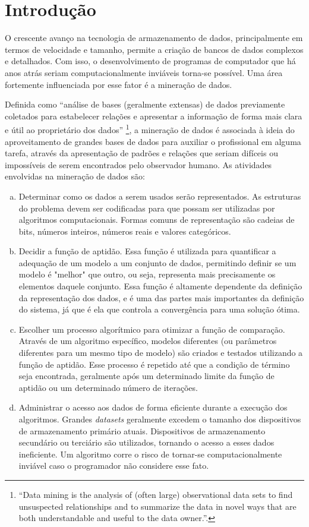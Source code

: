 \chapter{Introdução}

O crescente avanço na tecnologia de armazenamento de dados, principalmente em termos de velocidade e tamanho, permite a criação de bancos de dados complexos e detalhados. Com isso, o desenvolvimento de programas de computador que há anos atrás seriam computacionalmente inviáveis torna-se possível. Uma área fortemente influenciada por esse fator é a mineração de dados.

Definida como ``análise de bases (geralmente extensas) de dados previamente coletados para estabelecer relações e apresentar a informação de forma mais clara e útil ao proprietário dos dados'' \cite[p. 1]{Hand2001}\footnote{``Data mining is the analysis of (often large) observational data sets to find unsuspected relationships and to summarize the data in novel ways that are both understandable and useful to the data owner.''.}, a mineração de dados é associada à ideia do aproveitamento de grandes bases de dados para auxiliar o profissional em alguma tarefa, através da apresentação de padrões e relações que seriam difíceis ou impossíveis de serem encontrados pelo observador humano. As atividades envolvidas na mineração de dados são:

\begin{enumerate}[a)]
    \item Determinar como os dados a serem usados serão representados. As estruturas do problema devem ser codificadas para que possam ser utilizadas por algoritmos computacionais. Formas comuns de representação são cadeias de bits, números inteiros, números reais e valores categóricos.
    \item Decidir a função de aptidão. Essa função é utilizada para quantificar a adequação de um modelo a um conjunto de dados, permitindo definir se um modelo é "melhor" que outro, ou seja, representa mais precisamente os elementos daquele conjunto. Essa função é altamente dependente da definição da representação dos dados, e é uma das partes mais importantes da definição do sistema, já que é ela que controla a convergência para uma solução ótima.
    \item Escolher um processo algorítmico para otimizar a função de comparação. Através de um algoritmo específico, modelos diferentes (ou parâmetros diferentes para um mesmo tipo de modelo) são criados e testados utilizando a função de aptidão. Esse processo é repetido até que a condição de término seja encontrada, geralmente após um determinado limite da função de aptidão ou um determinado número de iterações.
    \item Administrar o acesso aos dados de forma eficiente durante a execução dos algoritmos. Grandes \emph{datasets} geralmente excedem o tamanho dos dispositivos de armazenamento primário atuais. Dispositivos de armazenamento secundário ou terciário são utilizados, tornando o acesso a esses dados ineficiente. Um algoritmo corre o risco de tornar-se computacionalmente inviável caso o programador não considere esse fato.
\end{enumerate}

